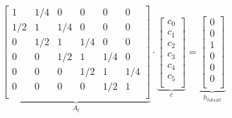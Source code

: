 \begin{minipage}{9cm}
				$\underbrace{\begin{bmatrix}
				1&1/4&0&0&0&0\\
				1/2&1&1/4&0&0&0\\
				0&1/2&1&1/4&0&0\\
				0&0&1/2&1&1/4&0\\
				0&0&0&1/2&1&1/4\\
				0&0&0&0&1/2&1\\
				\end{bmatrix}}_{A_t}\cdot
				\underbrace{\begin{bmatrix}
				c_0\\
				c_1\\
				c_2\\
				c_3\\
				c_4\\
				c_5\\
				\end{bmatrix}}_c=
				\underbrace{\begin{bmatrix}
				0\\
				0\\
				1\\
				0\\
				0\\
				0\\
				\end{bmatrix}}_{h_{totsoll}}$\\
         
				\vspace{0.25cm}
					
    \end{minipage}
		\hfill
